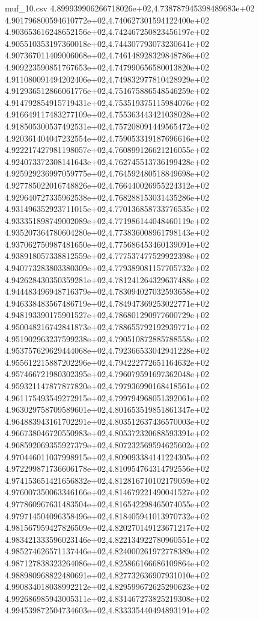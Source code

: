 \begin{filecontents*}{muf_10.csv}
4.899939906266718026e+02,4.738787945398489683e+02
4.901796800594610772e+02,4.740627301594122400e+02
4.903653616248652156e+02,4.742467250823456197e+02
4.905510353197360018e+02,4.744307793073230641e+02
4.907367011409006068e+02,4.746148928329848786e+02
4.909223590851767653e+02,4.747990656580013820e+02
4.911080091494202406e+02,4.749832977810428929e+02
4.912936512866061776e+02,4.751675886548546259e+02
4.914792854915719431e+02,4.753519375115984076e+02
4.916649117483277109e+02,4.755363443421038028e+02
4.918505300537492531e+02,4.757208091449565472e+02
4.920361404047232554e+02,4.759053319187696616e+02
4.922217427981198057e+02,4.760899126621216055e+02
4.924073372308141643e+02,4.762745513736199428e+02
4.925929236997059775e+02,4.764592480518849698e+02
4.927785022016748826e+02,4.766440026955224312e+02
4.929640727335962538e+02,4.768288153031435286e+02
4.931496352923711015e+02,4.770136858733776535e+02
4.933351898749002089e+02,4.771986144048460119e+02
4.935207364780604280e+02,4.773836008961798143e+02
4.937062750987481650e+02,4.775686453460139091e+02
4.938918057338812559e+02,4.777537477529922398e+02
4.940773283803380309e+02,4.779389081157705732e+02
4.942628430350359281e+02,4.781241264329637488e+02
4.944483496948716379e+02,4.783094027032593658e+02
4.946338483567486719e+02,4.784947369253022771e+02
4.948193390175901527e+02,4.786801290977600729e+02
4.950048216742841873e+02,4.788655792192939771e+02
4.951902963237599238e+02,4.790510872885788558e+02
4.953757629629444068e+02,4.792366533042941228e+02
4.955612215887202296e+02,4.794222772651164632e+02
4.957466721980302395e+02,4.796079591697362048e+02
4.959321147877877820e+02,4.797936990168418561e+02
4.961175493549272915e+02,4.799794968051392061e+02
4.963029758709589601e+02,4.801653519851861347e+02
4.964883943161702291e+02,4.803512637436570003e+02
4.966738046720550983e+02,4.805372320688593391e+02
4.968592069355927379e+02,4.807232569594625602e+02
4.970446011037998915e+02,4.809093384141224305e+02
4.972299871736606178e+02,4.810954764314792556e+02
4.974153651421656832e+02,4.812816710102179059e+02
4.976007350063346166e+02,4.814679221490041527e+02
4.977860967631483504e+02,4.816542298465074055e+02
4.979714504096358496e+02,4.818405941013970732e+02
4.981567959427826509e+02,4.820270149123671217e+02
4.983421333596023146e+02,4.822134922780960551e+02
4.985274626571137446e+02,4.824000261972778389e+02
4.987127838323264086e+02,4.825866166686109864e+02
4.988980968822480691e+02,4.827732636907931010e+02
4.990834018038992212e+02,4.829599672625290623e+02
4.992686985943005311e+02,4.831467273825219308e+02
4.994539872504734603e+02,4.833335440494893191e+02

\end{filecontents*}
